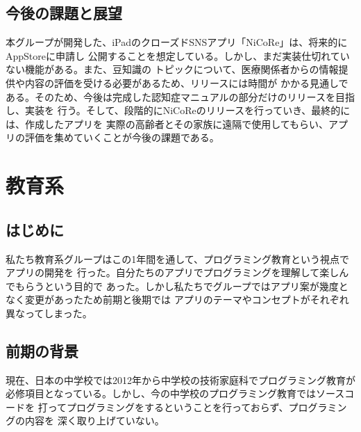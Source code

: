 \documentclass[twocolumn,draft]{jsarticle}
\begin{document}
\subsection{今後の課題と展望}
\begin{hissu}
本グループが開発した、iPadのクローズドSNSアプリ「NiCoRe」は、将来的にAppStoreに申請し
公開することを想定している。しかし、まだ実装仕切れていない機能がある。また、豆知識の
トピックについて、医療関係者からの情報提供や内容の評価を受ける必要があるため、リリースには時間が
かかる見通しである。そのため、今後は完成した認知症マニュアルの部分だけのリリースを目指し、実装を
行う。そして、段階的にNiCoReのリリースを行っていき、最終的には、作成したアプリを
実際の高齢者とその家族に遠隔で使用してもらい、アプリの評価を集めていくことが今後の課題である。


\end{hissu}





















\section{教育系}
\subsection{はじめに}
\begin{hissu}
私たち教育系グループはこの1年間を通して、プログラミング教育という視点でアプリの開発を
行った。自分たちのアプリでプログラミングを理解して楽しんでもらうという目的で
あった。しかし私たちでグループではアプリ案が幾度となく変更があったため前期と後期では
アプリのテーマやコンセプトがそれぞれ異なってしまった。
\end{hissu}

\subsection{前期の背景}
\begin{hissu}
現在、日本の中学校では2012年から中学校の技術家庭科でプログラミング教育が
必修項目となっている。しかし、今の中学校のプログラミング教育ではソースコードを
打ってプログラミングをするということを行っておらず、プログラミングの内容を
深く取り上げていない。
\end{hissu}
\end{document}

